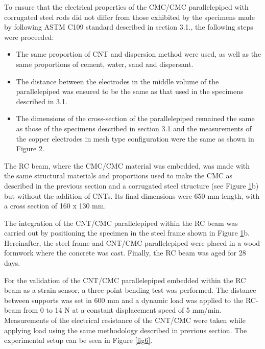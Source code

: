 \documentclass[twocolumn]{bmcart}%
\begin{document}
To ensure that the electrical properties of the CMC/CMC parallelepiped with corrugated steel rods did not differ from those exhibited by the specimens made by following ASTM C109 standard \cite{ASTMC1092000} described in section 3.1., the following steps were proceeded:

\begin{itemize}
\item The same proportion of CNT and dispersion method were used, as well as the same proportions of cement, water, sand and dispersant.

\item The distance between the electrodes in the middle volume of the parallelepiped was ensured to be the same as that used in the specimens described in 3.1.

\item The dimensions of the cross-section of the parallelepiped remained the same as those of the specimens described in section 3.1 and the measurements of the copper electrodes in mesh type configuration were the same as shown in Figure 2. 
\end{itemize}

The RC beam, where the CMC/CMC material was embedded, was made with the same structural materials and proportions used to make the CMC as described in the previous section and a corrugated steel structure (see Figure \ref{fig5}b) but without the addition of CNTs. Its final dimensions were 650 mm length, with a cross section of 160 x 130 mm.

The integration of the CNT/CMC parallelepiped within the RC beam was carried out by positioning the specimen in the steel frame shown in Figure \ref{fig5}b. Hereinafter, the steel frame and CNT/CMC parallelepiped were placed in a wood formwork where the concrete was cast. Finally, the RC beam was aged for 28 days. 

\begin{figure}[h!]
  \caption{
      }
      \label{fig5}
      \end{figure}


For the validation of the CNT/CMC parallelepiped embedded within the RC beam as a strain sensor, a three-point bending test was performed. The distance between supports was set in 600 mm and a dynamic load was applied to the RC-beam from 0 to 14 N at a constant displacement speed of 5 mm/min. Measurements of the electrical resistance of the CNT/CMC were taken while applying load using the same methodology described in previous section. The experimental setup can be seen in Figure \ref{fig6}.
\end{document}

